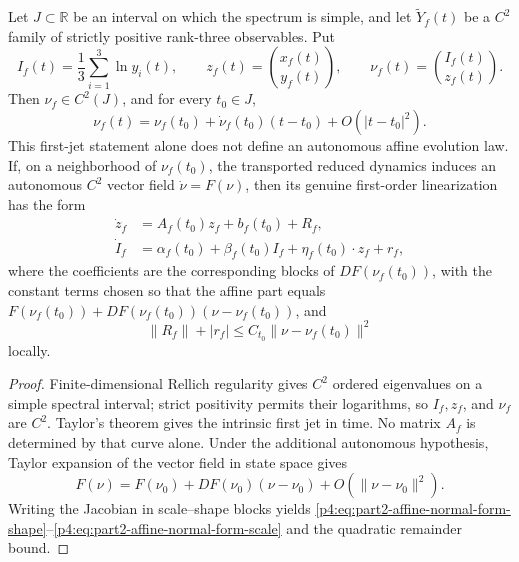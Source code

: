 \documentclass[12pt,a4paper]{article}
\begin{document}
\begin{theorem}
\label{p4:thm:local-affine-normal-form}
Let \(J\subset\mathbb R\) be an interval on which the spectrum is simple, and let
\(\widetilde Y_f(t)\) be a \(C^2\) family of strictly positive rank-three
observables.  Put
\[
I_f(t)=\frac13\sum_{i=1}^3\ln y_i(t),
\qquad
z_f(t)=\binom{x_f(t)}{y_f(t)},
\qquad
\nu_f(t)=\binom{I_f(t)}{z_f(t)}.
\]
Then \(\nu_f\in C^2(J)\), and for every \(t_0\in J\),
\[
\nu_f(t)=\nu_f(t_0)+\dot\nu_f(t_0)(t-t_0)+O(|t-t_0|^2).
\]
This first-jet statement alone does not define an autonomous affine evolution law.
If, on a neighborhood of \(\nu_f(t_0)\), the transported reduced dynamics induces an
autonomous \(C^2\) vector field \(\dot\nu=F(\nu)\), then its genuine first-order
linearization has the form
\begin{align}
\label{p4:eq:part2-affine-normal-form-shape}
\dot z_f
&=A_f(t_0)z_f+b_f(t_0)+R_f,\\
\label{p4:eq:part2-affine-normal-form-scale}
\dot I_f
&=\alpha_f(t_0)+\beta_f(t_0)I_f+\eta_f(t_0)\!\cdot z_f+r_f,
\end{align}
where the coefficients are the corresponding blocks of \(DF(\nu_f(t_0))\), with the
constant terms chosen so that the affine part equals
\(F(\nu_f(t_0))+DF(\nu_f(t_0))(\nu-\nu_f(t_0))\), and
\begin{equation}
\label{p4:eq:part2-affine-remainder}
\|R_f\|+|r_f|\le C_{t_0}\|\nu-\nu_f(t_0)\|^2
\end{equation}
locally.
\end{theorem}

\begin{proof}
Finite-dimensional Rellich regularity gives \(C^2\) ordered eigenvalues on a simple
spectral interval; strict positivity permits their logarithms, so \(I_f,z_f\), and
\(\nu_f\) are \(C^2\).  Taylor's theorem gives the intrinsic first jet in time.
No matrix \(A_f\) is determined by that curve alone.  Under the additional autonomous
hypothesis, Taylor expansion of the vector field in state space gives
\[
F(\nu)=F(\nu_0)+DF(\nu_0)(\nu-\nu_0)+O(\|\nu-\nu_0\|^2).
\]
Writing the Jacobian in scale--shape blocks yields
\eqref{p4:eq:part2-affine-normal-form-shape}--\eqref{p4:eq:part2-affine-normal-form-scale}
and the quadratic remainder bound.
\end{proof}
\end{document}
